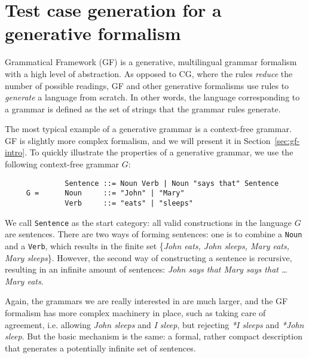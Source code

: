 

\section{Test case generation for a generative formalism}

Grammatical Framework (GF) \cite{ranta2011gfbook} is a generative, multilingual grammar formalism with a high level of abstraction.
As opposed to CG, where the rules \emph{reduce} the number of possible readings, GF and other generative formalisms use rules to \emph{generate} a language from scratch. In other words, the language corresponding to a grammar is defined as the set of strings that the grammar rules generate.

The most typical example of a generative grammar is a context-free grammar. GF is slightly more complex formalism, and we will present it in Section~\ref{sec:gf-intro}. To quickly illustrate the properties of a generative grammar, we use the following context-free grammar $G$:

\begin{verbatim}
              Sentence ::= Noun Verb | Noun "says that" Sentence
     G =      Noun     ::= "John" | "Mary"
              Verb     ::= "eats" | "sleeps"
\end{verbatim}

We call \texttt{Sentence} as the start category: all valid constructions in the language $G$ are sentences. There are two ways of forming sentences: one is to combine a \texttt{Noun} and a \texttt{Verb}, which results in the finite set \{\emph{John eats, John sleeps, Mary eats, Mary sleeps}\}. However, the second way of constructing a sentence is recursive, resulting in an infinite amount of sentences: \emph{John says that Mary says that \dots Mary eats}.

Again, the grammars we are really interested in are much larger, and the GF formalism has more complex machinery in place, such as taking care of agreement, i.e. allowing \emph{John sleeps} and \emph{I sleep}, but rejecting \emph{*I sleeps} and \emph{*John sleep}. But the basic mechanism is the same: a formal, rather compact description that generates a potentially infinite set of sentences.

